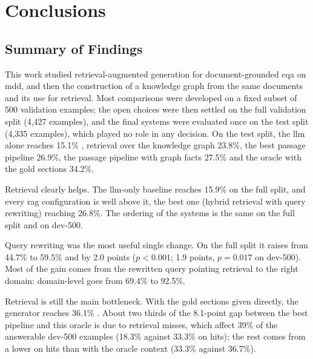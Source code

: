 
\chapter*{Conclusions}\label{ch:conclusions}


\section*{Summary of Findings}

This work studied retrieval-augmented generation for document-grounded \gls{cqa} on
\gls{mdd}, and then the construction of a knowledge graph from the same documents and
its use for retrieval. Most comparisons were developed on a fixed subset of 500
validation examples; the open choices were then settled on the full validation split
(4{,}427 examples), and the final systems were evaluated once on the test split (4{,}335
examples), which played no role in any decision. On the test split, the \gls{llm} alone
reaches 15.1\% \fone{}, retrieval over the knowledge graph 23.8\%, the best passage
pipeline 26.9\%, the passage pipeline with graph facts 27.5\% and the oracle with the gold
sections 34.2\%.

Retrieval clearly helps. The \gls{llm}-only baseline reaches 15.9\% \fone{} on the full
split, and every \gls{rag} configuration is well above it, the best one (hybrid retrieval
with query rewriting) reaching 26.8\%. The ordering of the systems is the same on the full
split and on dev-500.

Query rewriting was the most useful single change. On the full split it raises 
from 44.7\% to 59.5\% and \fone{} by 2.0 points ($p < 0.001$; 1.9 points, $p = 0.017$
on dev-500). Most of the gain comes from the rewritten query pointing retrieval to the
right domain: domain-level  goes from 69.4\% to 92.5\%.

Retrieval is still the main bottleneck. With the gold sections given directly, the
generator reaches 36.1\% \fone{}. About two thirds of the 8.1-point gap between the best
pipeline and this oracle is due to retrieval misses, which affect 39\% of the answerable
dev-500 examples (18.3\% \fone{} against 33.3\% on hits); the rest comes from a lower
\fone{} on hits than with the oracle context (33.3\% against 36.7\%).

